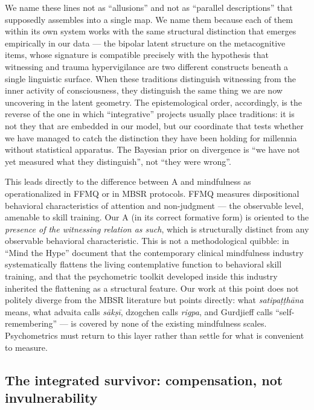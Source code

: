 We name these lines not as ``allusions'' and not as ``parallel descriptions'' that \DEIC{} supposedly assembles into a single map. We name them because each of them within its own system works with the same structural distinction that emerges empirically in our data --- the bipolar latent structure on the metacognitive items, whose signature is compatible precisely with the hypothesis that witnessing and trauma hypervigilance are two different constructs beneath a single linguistic surface. When these traditions distinguish witnessing from the inner activity of consciousness, they distinguish the same thing we are now uncovering in the latent geometry. The epistemological order, accordingly, is the reverse of the one in which ``integrative'' projects usually place traditions: it is not they that are embedded in our model, but our coordinate that tests whether we have managed to catch the distinction they have been holding for millennia without statistical apparatus. The Bayesian prior on divergence is ``we have not yet measured what they distinguish'', not ``they were wrong''.

This leads directly to the difference between A and mindfulness as operationalized in FFMQ or in MBSR protocols. FFMQ measures dispositional behavioral characteristics of attention and non-judgment --- the observable level, amenable to skill training. Our A (in its correct formative form) is oriented to the \emph{presence of the witnessing relation as such}, which is structurally distinct from any observable behavioral characteristic. This is not a methodological quibble: \citet{vandam2018} in ``Mind the Hype'' document that the contemporary clinical mindfulness industry systematically flattens the living contemplative function to behavioral skill training, and that the psychometric toolkit developed inside this industry inherited the flattening as a structural feature. Our work at this point does not politely diverge from the MBSR literature but points directly: what \textit{satipaṭṭhāna} means, what advaita calls \textit{sākṣī}, dzogchen calls \textit{rigpa}, and Gurdjieff calls ``self-remembering'' --- is covered by none of the existing mindfulness scales. Psychometrics must return to this layer rather than settle for what is convenient to measure.

\subsection{The integrated survivor: compensation, not invulnerability}
\label{subsec:integrated_survivor}

